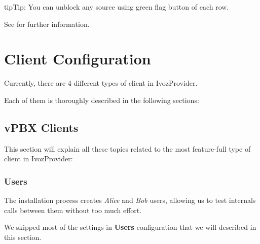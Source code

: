 \documentclass[letterpaper,10pt,english]{sphinxmanual}
\begin{document}
\begin{notice}{tip}{Tip:}
You can unblock any source using green flag button of each row.
\end{notice}

See {\hyperref[security_and_maintenance/security/antibruteforce:anti\string-brute\string-force\string-attacks]{}} for further information.


\chapter{Client Configuration}
\label{administration_portal/client/index:client-configuration}\label{administration_portal/client/index::doc}
Currently, there are 4 different types of client in IvozProvider.

Each of them is thoroughly described in the following sections:
\label{administration_portal/client/vpbx/index:vpbx-clients}

\section{vPBX Clients}
\label{administration_portal/client/vpbx/index:vpbx-clients}\label{administration_portal/client/vpbx/index:clientes-vpbx}\label{administration_portal/client/vpbx/index::doc}\label{administration_portal/client/vpbx/index:id1}
This section will explain all these topics related to the most feature-full type of client in IvozProvider:


\subsection{Users}
\label{administration_portal/client/vpbx/users::doc}\label{administration_portal/client/vpbx/users:users}\label{administration_portal/client/vpbx/users:id1}
The installation process creates \emph{Alice} and \emph{Bob} users, allowing us
to test internals calls between them without too much effort.

We skipped most of the settings in \textbf{Users} configuration that we will described
in this section.
\end{document}
